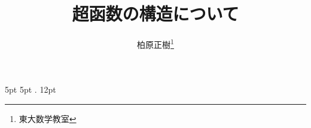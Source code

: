 \newcommand{\simar}{\mathrel{\overset{\sim}{\rightarrow}}}%
\newcommand{\simarr}{\mathrel{\overset{\sim}{\longrightarrow}}}%
\newcommand{\simra}{\mathrel{\overset{\sim}{\leftarrow}}}%
\newcommand{\simrra}{\mathrel{\overset{\sim}{\longleftarrow}}}%



    {5pt}%
    {5pt}%
    {}%
    {}%
    {\bfseries}%
    {.}%
    {12pt}%
    {}%

\theoremstyle{mystyle}
\newtheorem{AXM}{公理}[section]
\newtheorem{DFN}[AXM]{定義}
\newtheorem{THM}[AXM]{定理}
\newtheorem*{THM*}{定理}
\newtheorem{PRP}[AXM]{命題}
\newtheorem{LMM}[AXM]{補題}
\newtheorem{CRL}[AXM]{系}
\newtheorem{EG}[AXM]{例}
\newtheorem{CNV}[AXM]{規約}





\def\inner<#1>{\langle #1 \rangle}

\def\ind<#1>{\mathop{\text{``}\hspace{-0.7pt}#1\limits\hspace{-1.5pt}\text{''}}}








\title{超函数の構造について}
\author{柏原正樹\thanks{東大数学教室}}
\date{}

